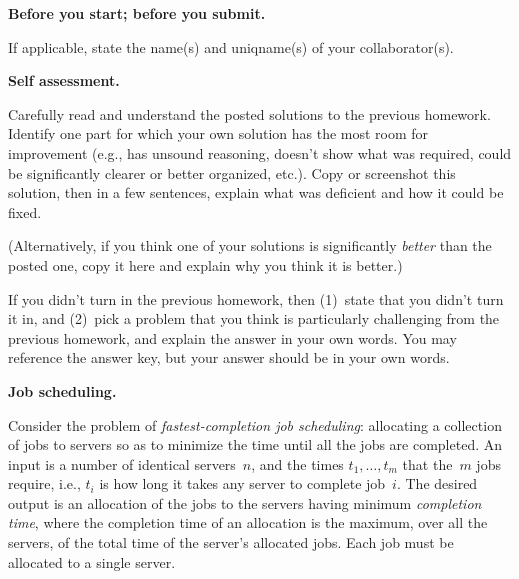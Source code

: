 \documentclass[11pt,addpoints,answers]{exam}
\begin{document}
\hwpreface

\pointsinmargin
{}
\marginpointname{ \points}
\marginbonuspointname{ \bonuspoints}

\begin{questions}
  \addtocounter{question}{-1}

  \question[0] \textbf{Before you start; before you submit.}
  
    If applicable, state the name(s) and uniqname(s) of your collaborator(s).

    \begin{solution}
    
    \end{solution}

  \question[10] \textbf{Self assessment.}
  
  Carefully read and understand the posted solutions to the previous homework.
  Identify one part for which your own solution has the most room for improvement (e.g., has unsound reasoning, doesn’t show what was required, could be significantly clearer or better organized, etc.).
  Copy or screenshot this solution, then in a few sentences, explain what was deficient and how it could be fixed.

  (Alternatively, if you think one of your solutions is significantly \emph{better} than the posted one, copy it here and explain why you think it is better.)

  If you didn't turn in the previous homework, then (1)~state that you didn't turn it in, and (2)~pick a problem that you think is particularly challenging from the previous homework, and explain the answer in your own words.
  You may reference the answer key, but your answer should be in your own words.

  \begin{solution}

  \end{solution}

  \question \textbf{Job scheduling.}
  
  Consider the problem of \emph{fastest-completion job scheduling}: allocating a collection of jobs to servers so as to minimize the time until all the jobs are completed.
  An input is a number of identical servers~$n$, and the times $t_{1}, \ldots, t_{m}$ that the~$m$ jobs require, i.e., $t_{i}$ is how long it takes any server to complete job~$i$.
  The desired output is an allocation of the jobs to the servers having minimum \emph{completion time}, where the completion time of an allocation is the maximum, over all the servers, of the total time of the server's allocated jobs.
  Each job must be allocated to a single server.
   

\end{questions}
\end{document}
